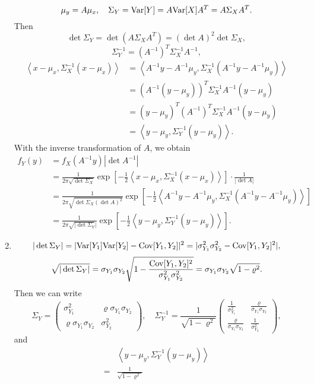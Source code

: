 \documentclass[11pt,a4paper]{article}
\begin{document}
\begin{enumerate}[label=\roman*)]
$$\mu_y=A\mu_x,\quad \Sigma_Y={\rm Var}[Y]=A{\rm Var}[X]A^T=A\Sigma_XA^T.$$
Then
$$\det\Sigma_Y=\det(A\Sigma_XA^T)=(\det A)^2\det\Sigma_X,$$
$$\Sigma_Y^{-1}=(A^{-1})^T\Sigma_X^{-1}A^{-1},$$
\begin{align*}
\left\langle x-\mu_x, \Sigma^{-1}_X (x-\mu_x) \right\rangle
&=\left\langle A^{-1}y-A^{-1}\mu_y, \Sigma^{-1}_X (A^{-1}y-A^{-1}\mu_y) \right\rangle\\
&=(A^{-1}(y-\mu_y))^T\Sigma^{-1}_X A^{-1}(y-\mu_y)\\
&=(y-\mu_y)^T(A^{-1})^T\Sigma^{-1}_X A^{-1}(y-\mu_y)\\
&=\left\langle y-\mu_y, \Sigma^{-1}_Y (y-\mu_y) \right\rangle.
\end{align*}
With the inverse transformation of $A$, we obtain
\begin{align*}
f_Y(y)&=f_X(A^{-1}y)|\det A^{-1}|\\
&=\frac{1}{2\pi\sqrt{\det\Sigma_X}}\exp\left[-\frac{1}{2}\left\langle x-\mu_x, \Sigma^{-1}_X (x-\mu_x) \right\rangle\right]\cdot\frac{1}{|\det A|}\\
&=\frac{1}{2\pi\sqrt{\det\Sigma_X(\det A)^2}}\exp\left[-\frac{1}{2}\left\langle A^{-1}y-A^{-1}\mu_y, \Sigma^{-1}_X (A^{-1}y-A^{-1}\mu_y) \right\rangle\right]\\
&=\frac{1}{2\pi\sqrt{|\det\Sigma_Y}|}\exp\left[-\frac{1}{2}\left\langle y-\mu_y, \Sigma^{-1}_Y (y-\mu_y) \right\rangle\right].
\end{align*}
\item
$$|\det\Sigma_Y|=|{\rm Var}[Y_1]{\rm Var}[Y_2]-{\rm Cov}[Y_1,Y_2]|^2=|\sigma_{Y_1}^2\sigma_{Y_2}^2-{\rm Cov}[Y_1,Y_2]^2|,$$
$$\sqrt{|\det\Sigma_Y|}=\sigma_{Y_1}\sigma_{Y_2}\sqrt{1-\frac{{\rm Cov}[Y_1,Y_2]^2}{\sigma_{Y_1}^2\sigma_{Y_2}^2}}=\sigma_{Y_1}\sigma_{Y_2}\sqrt{1-\varrho^2}.$$
Then we can write
$$\Sigma_Y=\begin{pmatrix}
\sigma_{Y_1}^2 & \varrho\sigma_{Y_1}\sigma_{Y_2} \\
\varrho\sigma_{Y_1}\sigma_{Y_2} & \sigma_{Y_2}^2
\end{pmatrix},\quad\Sigma_Y^{-1}=\frac{1}{\sqrt{1-\varrho^2}}\begin{pmatrix}
\frac{1}{\sigma_{Y_1}^2} & \frac{\varrho}{\sigma_{Y_1}\sigma_{Y_2}} \\
\frac{\varrho}{\sigma_{Y_1}\sigma_{Y_2}} & \frac{1}{\sigma_{Y_2}^2}
\end{pmatrix},$$
and
\begin{align*}
&\left\langle y-\mu_y, \Sigma^{-1}_Y (y-\mu_y) \right\rangle\\
=&\frac{1}{\sqrt{1-\varrho^2}}

\end{align*}
\end{enumerate}
\end{document}
